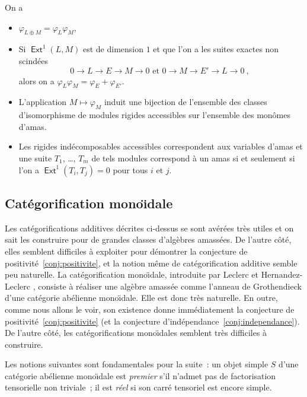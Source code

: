 \documentclass[brochure,12pt]{bourbaki}
\newcommand{\ko}{\: , \;}
\numberwithin{equation}{subsection}
\numberwithin{theorem}{section}
\newcommand{\opname}[1]{\operatorname{\mathsf{#1}}}
\newcommand{\Ext}{\opname{Ext}}
\renewcommand{\phi}{\varphi}
\begin{document}
\begin{theo} On a
\begin{itemize}
\item[a)] $\phi_{L\oplus M} = \phi_L \phi_M$,
\item[b)] Si $\Ext^1(L,M)$ est de dimension $1$ et que l'on a les
suites exactes non scind\'ees
\[
0 \to L \to E \to M \to 0 \mbox{ et } 0 \to M \to E' \to L \to 0 \ko
\]
alors on a $\phi_L \phi_M = \phi_E + \phi_{E'}$.
\item[c)] L'application $M \mapsto \phi_M$ induit
une bijection de l'ensemble des classes d'isomorphisme de modules rigides
accessibles sur l'ensemble des mon\^omes d'amas.
\item[d)] Les rigides ind\'ecomposables accessibles correspondent
aux variables d'amas et une suite $T_1$, \ldots, $T_m$ de tels
modules correspond \`a un amas si et seulement si l'on a
$\Ext^1(T_i, T_j)=0$ pour tous $i$ et $j$.
\end{itemize}
\end{theo}



\subsection{Cat\'egorification mono\"{\i}dale}
\label{ss:categorification-monoidale}
Les cat\'egorifications additives d\'ecrites ci-dessus se sont av\'er\'ees
tr\`es utiles et on sait les construire pour de grandes classes d'alg\`ebres
amass\'ees. De l'autre c\^ot\'e, elles semblent difficiles \`a exploiter
pour d\'emontrer la conjecture de positivit\'e~\ref{conj:positivite}, et la notion m\^eme de
cat\'egorification additive semble peu naturelle. La cat\'egorification
mono\"{\i}dale, introduite par Leclerc \cite{Leclerc08a} et
Hernandez-Leclerc \cite{HernandezLeclerc09}, consiste \`a r\'ealiser
une alg\`ebre amass\'ee comme l'anneau de Grothendieck d'une cat\'egorie
ab\'elienne mono\"{\i}dale. Elle est donc tr\`es naturelle. En outre,
comme nous allons le voir, son existence donne imm\'ediatement la conjecture
de positivit\'e~\ref{conj:positivite} (et la conjecture d'ind\'ependance~\ref{conj:independance}).
De l'autre c\^ot\'e, les cat\'egorifications mono\"{\i}dales
semblent tr\`es difficiles \`a construire.

Les notions suivantes \cite{Leclerc08a} sont fondamentales pour la suite~:
un objet simple $S$ d'une cat\'egorie ab\'elienne mono\"{\i}dale est {\em premier}
s'il n'admet pas de factorisation tensorielle non triviale~; il est {\em r\'eel}
si son carr\'e tensoriel est encore simple.
\end{document}
